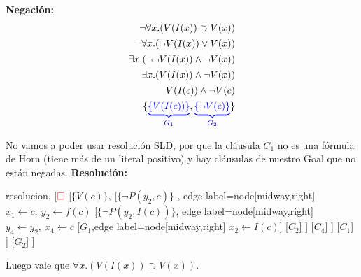 \documentclass[10pt,a4paper]{article}
\begin{document}
\textbf{Negación:}
\begin{align*}
\lnot\forall x.(V (I(x)) \supset V (x)) \\[1pt]
\lnot\forall x.(\lnot V (I(x)) \lor V (x)) \\[1pt]
\exists x.(\lnot\lnot V (I(x)) \land \lnot V (x)) \\[1pt]
\exists x.(V (I(x)) \land \lnot V (x)) \\[1pt]
V (I(c)) \land \lnot V (c) \\[1pt]
\{{\color{blue}\underbrace{\{V (I(c))\}}_{G_1}},{\color{blue}\underbrace{\{\lnot V (c)\}}_{G_2}}\} \\[1pt]
\end{align*}

 No vamos a poder usar resolución SLD, por que la cláusula $C_1$ no es una fórmula de Horn (tiene más de un literal positivo) y hay cláusulas de nuestro Goal que no están negadas.
\textbf{Resolución:}
\begin{center}
	\begin{forest} resolucion,
[${\color{red}\Box}$ 
        	[$\{V(c)\}$,
            	[$\{\lnot P(y_2\comma c)\}$
            	, edge label={node[midway,right] {$x_1\leftarrow c,~y_2\leftarrow f(c)$}}
                	[$\{\lnot P(y_2\comma I(c))\}$, edge label={node[midway,right] {$y_4\leftarrow y_2,~x_4\leftarrow c$}}
                    	[$G_1$,edge label={node[midway,right] {$x_2\leftarrow I(c)$}}]
                    	[$C_2$]
                	]
                	[$C_4$]
            	]
            	[$C_1$]
        	]
        	[$G_2$]
]
	\end{forest}
\end{center}
Luego vale que $\forall x.(V (I(x)) \supset V (x))$.
\end{document}
